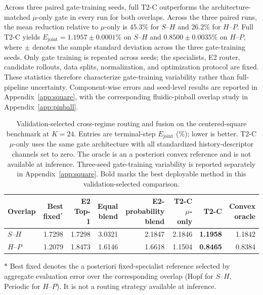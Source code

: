 \documentclass{article}
\begin{document}
Across three paired gate-training seeds, full T2-C outperforms the architecture-matched $\mu$-only gate in every run for both overlaps.
Across the three paired runs, the mean reduction relative to $\mu$-only is $45.3\%$ for $S$--$H$ and $26.2\%$ for $H$--$P$. Full T2-C yields
$E_{\mathrm{joint}}=1.1957\pm0.0001\%$ on $S$--$H$ and $0.8500\pm0.0035\%$ on $H$--$P$, where $\pm$ denotes the sample standard
deviation across the three gate-training seeds. Only gate training is repeated across seeds; the specialists, E2 router, candidate rollouts, data splits, normalization, and optimization protocol are fixed. These statistics therefore characterize gate-training variability rather than full-pipeline uncertainty. Component-wise errors and seed-level results are reported in Appendix~\ref{app:square}, with the corresponding fluidic-pinball overlap study in Appendix~\ref{app:pinball}.


\par


\begin{table}[H]
\centering
\caption{
Validation-selected cross-regime routing and fusion on the centered-square benchmark at $K=24$. Entries are terminal-step $E_{\mathrm{joint}}$ (\%); lower is better. T2-C $\mu$-only uses the same gate architecture with all standardized history-descriptor channels set to zero. The oracle is an a posteriori convex reference and is not available at inference. Three-seed gate-training variability is reported separately in
Appendix~\ref{app:square}. Bold marks the best deployable method in this validation-selected comparison.
}
\label{tab:routing_fusion}
\small
\setlength{\tabcolsep}{3.5pt}
\begin{threeparttable}
\begin{tabular}{@{}lrrrrrrr@{}}
\toprule
Overlap & Best fixed$^\ast$ & E2 Top-1 & \shortstack{Equal\\blend} & \shortstack{E2-probability\\blend} & \shortstack{T2-C\\$\mu$-only} & T2-C & \shortstack{Convex\\oracle}\\
\midrule
$S$--$H$ & 1.7298 & 1.7298 & 3.0321 & 2.1847 & 2.1846 & \textbf{1.1958} & 1.1842 \\
$H$--$P$ & 1.2079 & 1.8473 & 1.6146 & 1.6618 & 1.1504 & \textbf{0.8465} & 0.8384 \\
\bottomrule
\end{tabular}
\begin{tablenotes}[flushleft]
\footnotesize
\item[$\ast$] Best fixed denotes the a posteriori fixed-specialist reference selected by aggregate evaluation error over the corresponding overlap (Hopf for $S$--$H$, Periodic for $H$--$P$). It is not a routing strategy available at inference.
\end{tablenotes}
\end{threeparttable}
\end{table}
\end{document}
